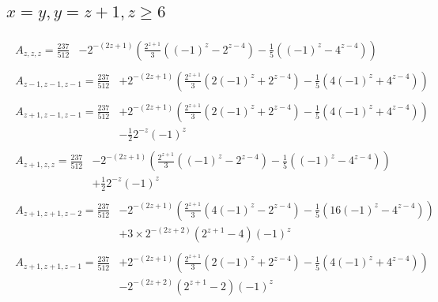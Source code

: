 \subsection*{$x=y,y=z+1,z\ge6$}
\begin{align*}
\begin{split}
A_{z,z,z}=\frac{237}{512} &-2^{-(2z+1)}\left(\frac{2^{z+1}}{3}\left((-1)^z-2^{z-4}\right)-\frac{1}{5}\left((-1)^z-4^{z-4}\right)\right)
\end{split}\\
\begin{split}
A_{z-1,z-1,z-1}=\frac{237}{512} &+2^{-(2z+1)}\left(\frac{2^{z+1}}{3}\left(2(-1)^z+2^{z-4}\right)-\frac{1}{5}\left(4(-1)^z+4^{z-4}\right)\right)
\end{split}\\
\begin{split}
A_{z+1,z-1,z-1}=\frac{237}{512} &+2^{-(2z+1)}\left(\frac{2^{z+1}}{3}\left(2(-1)^z+2^{z-4}\right)-\frac{1}{5}\left(4(-1)^z+4^{z-4}\right)\right)\\
& -\frac{1}{2}2^{-z}(-1)^z
\end{split}\\
\begin{split}
A_{z+1,z,z}=\frac{237}{512} &-2^{-(2z+1)}\left(\frac{2^{z+1}}{3}\left((-1)^z-2^{z-4}\right)-\frac{1}{5}\left((-1)^z-4^{z-4}\right)\right)\\
& +\frac{1}{2}2^{-z}(-1)^z
\end{split}\\
\begin{split}
A_{z+1,z+1,z-2}=\frac{237}{512} &-2^{-(2z+1)}\left(\frac{2^{z+1}}{3}\left(4(-1)^z-2^{z-4}\right)-\frac{1}{5}\left(16(-1)^z-4^{z-4}\right)\right)\\
& +3\times2^{-(2z+2)}\left(2^{z+1}-4\right)(-1)^z
\end{split}\\
\begin{split}
A_{z+1,z+1,z-1}=\frac{237}{512} &+2^{-(2z+1)}\left(\frac{2^{z+1}}{3}\left(2(-1)^z+2^{z-4}\right)-\frac{1}{5}\left(4(-1)^z+4^{z-4}\right)\right)\\
& -2^{-(2z+2)}\left(2^{z+1}-2\right)(-1)^z
\end{split}
\end{align*}

\newpage
